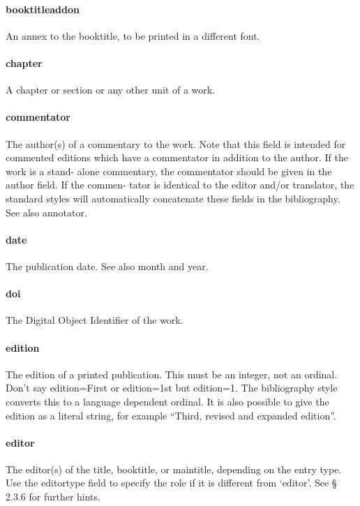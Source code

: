 \documentclass[a4paper,12pt]{report}
\begin{document}
\paragraph{booktitleaddon}
An annex to the booktitle, to be printed in a different font.

\paragraph{chapter}
A chapter or section or any other unit of a work.

\paragraph{commentator}
The author(s) of a commentary to the work. Note that this field is intended for commented
editions which have a commentator in addition to the author. If the work is a stand-
alone commentary, the commentator should be given in the author field. If the commen-
tator is identical to the editor and/or translator, the standard styles will automatically
concatenate these fields in the bibliography. See also annotator.

\paragraph{date}
The publication date. See also month and year.

\paragraph{doi}
The Digital Object Identifier of the work.

\paragraph{edition}
The edition of a printed publication. This must be an integer, not an ordinal. Don’t say
edition={First} or edition={1st} but edition={1}. The bibliography style converts
this to a language dependent ordinal. It is also possible to give the edition as a literal string,
for example “Third, revised and expanded edition”.

\paragraph{editor}
The editor(s) of the title, booktitle, or maintitle, depending on the entry type. Use the
editortype field to specify the role if it is different from ‘editor’. See § 2.3.6 for further
hints.
\end{document}
